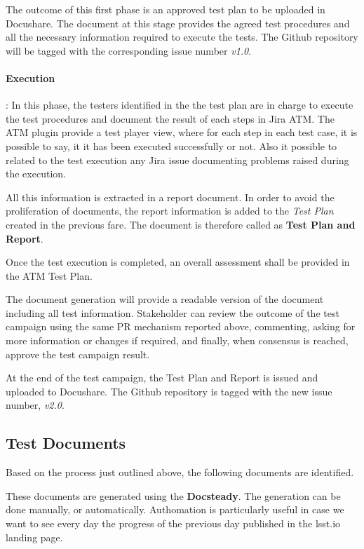 The outcome of this first phase is an approved test plan to be uploaded in Docushare. 
The document at this stage provides the agreed test procedures and all the necessary information required to execute the tests.
The Github repository will be tagged with the corresponding issue number \textit{v1.0}.

\paragraph{Execution}:
In this phase, the testers identified in the the test plan are in charge to execute the test procedures and 
document the result of each steps in Jira ATM.
The ATM plugin provide a test player view, where for each step in each test case, it is possible to say, it it has been executed successfully or not.
Also it possible to related to the test execution any Jira issue documenting problems raised during the execution.

All this information is extracted in a report document.
In order to avoid the proliferation of documents, the  report information is added to the \textit{Test Plan} created in the previous fare.
The document is therefore called as \textbf{Test Plan and Report}.

Once the test execution is completed, an overall assessment shall be provided in the ATM Test Plan.

The document generation will provide a readable version of the document including all test information.
Stakeholder can review the outcome of the test campaign using the same PR mechanism reported above, 
commenting, asking for more information or changes if required, and finally, when consensus is reached, approve the test campaign result.

At the end of the test campaign, the Test Plan and Report is issued and uploaded to Docushare.
The Github repository is tagged with the new issue number, \textit{v2.0}.


\subsection{Test Documents}

Based on the process just outlined above, the following documents are identified.

These documents are generated using the \textbf{Docsteady}.
The generation can be done manually, or automatically.
Authomation is particularly useful in case we want to see every day the progress of the previous day published in the lsst.io landing page.


